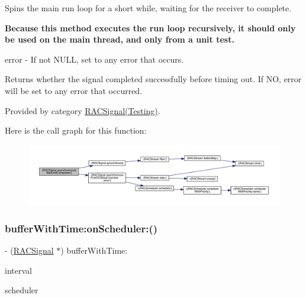 Spins the main run loop for a short while, waiting for the receiver to complete.

{\bfseries Because this method executes the run loop recursively, it should only be used on the main thread, and only from a unit test.}

error -\/ If not N\+U\+LL, set to any error that occurs.

Returns whether the signal completed successfully before timing out. If NO, {\ttfamily error} will be set to any error that occurred. 

Provided by category \mbox{\hyperlink{category_r_a_c_signal_07_testing_08_a29ac4be53792963e1c7e5c59e545e6cd}{R\+A\+C\+Signal(\+Testing)}}.

Here is the call graph for this function\+:\nopagebreak
\begin{figure}[H]
\begin{center}
\leavevmode
\includegraphics[width=350pt]{interface_r_a_c_signal_a29ac4be53792963e1c7e5c59e545e6cd_cgraph}
\end{center}
\end{figure}
\mbox{\label{interface_r_a_c_signal_a7f0cb2086a2123f40552d2eab2a9cc54}} 
\subsubsection{\texorpdfstring{buffer\+With\+Time\+:on\+Scheduler\+:()}{bufferWithTime:onScheduler:()}\hspace{0.1cm}{\footnotesize\ttfamily [1/3]}}
{\footnotesize\ttfamily -\/ (\mbox{\hyperlink{interface_r_a_c_signal}{R\+A\+C\+Signal}} $\ast$) buffer\+With\+Time\+: \begin{DoxyParamCaption}\item[{(N\+S\+Time\+Interval)}]{interval }\item[{onScheduler:(\mbox{\hyperlink{interface_r_a_c_scheduler}{R\+A\+C\+Scheduler}} $\ast$)}]{scheduler }\end{DoxyParamCaption}}

